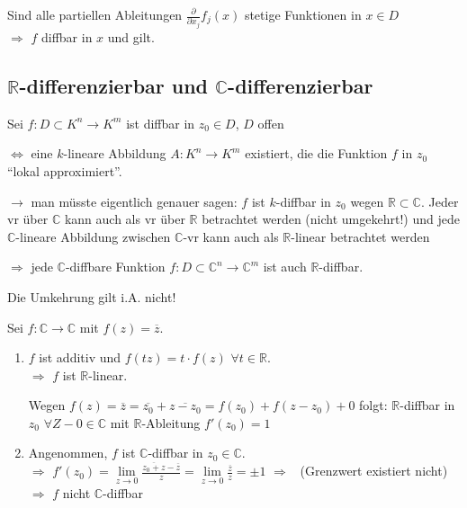 \begin{underlinedenvironment}[Ausblick]
	Sind alle partiellen Ableitungen $\frac{\partial}{\partial x_j} f_j(x)$ stetige Funktionen in $x\in D$ \\
	$\Rightarrow$ $f$ \gls{diffbar} in $x$ und  gilt.
\end{underlinedenvironment}

\subsection{$\mathbf{\mathbb{R}}$-differenzierbar und $\mathbf{\mathbb{C}}$-differenzierbar}
Sei $f:D\subset K^n\to K^m$ ist \gls{diffbar} in $z_0 \in D$, $D$ offen

$\Leftrightarrow$ eine $k$-lineare Abbildung $A:K^n\to K^m$ existiert, die die Funktion $f$ in $z_0$ "`lokal approximiert"'.

$\rightarrow$ man müsste eigentlich genauer sagen: $f$ ist $k$-\gls{diffbar} in $z_0$ wegen $\mathbb{R}\subset\mathbb{C}$. Jeder \gls{vr} über $\mathbb{C}$ kann auch als \gls{vr} über $\mathbb{R}$ betrachtet werden (nicht umgekehrt!) und jede $\mathbb{C}$-lineare Abbildung zwischen $\mathbb{C}$-\gls{vr} kann auch als $\mathbb{R}$-linear betrachtet werden

$\Rightarrow$ jede $\mathbb{C}$-\gls{diffbar}e Funktion $f:D\subset \mathbb{C}^n\to \mathbb{C}^m$ ist auch $\mathbb{R}$-\gls{diffbar}.

Die Umkehrung gilt i.A. nicht!

\begin{example}
	Sei $f:\mathbb{C}\to\mathbb{C}$ mit $f(z) = \overline{z}$.
	\begin{enumerate}[label={\alph*)}]
		\item $f$ ist additiv und $f(tz) = t\cdot f(z)$ $\forall t\in \mathbb{R}$. \\
		$\Rightarrow$ $f$ ist $\mathbb{R}$-linear.
		
		Wegen $f(z) = \overline{z} = \overline{z_0} + \overline{z - z_0} = f(z_0) + f(z - z_0) + 0$ folgt: $\mathbb{R}$-\gls{diffbar} in $z_0$ $\forall Z-0\in\mathbb{C}$ mit $\mathbb{R}$-Ableitung $f'(z_0) = 1$
		
		\item Angenommen, $f$ ist $\mathbb{C}$-\gls{diffbar} in $z_0\in\mathbb{C}$.\\
		$\Rightarrow$ $f'(z_0) = \lim\limits_{z\to 0} \frac{\overline{z_0 + z} - \overline{z}}{z} = \lim\limits_{z\to 0} \frac{\overline{z}}{z} = \pm 1$ $\Rightarrow$ \Lightning\ (Grenzwert existiert nicht) \\
		$\Rightarrow$ $f$ nicht $\mathbb{C}$-\gls{diffbar}
	\end{enumerate}
\end{example}

